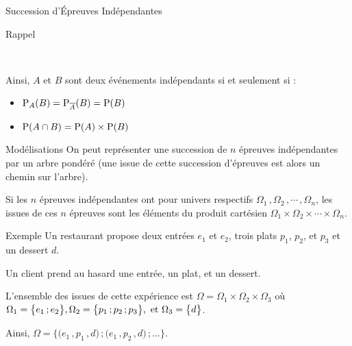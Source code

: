 \documentclass{coursbook}
\begin{document}
\begin{Gpartie}{Succession d'Épreuves Indépendantes}
\begin{Spartie}{Rappel}
\begin{center}
                \parbox{\linewidth}{} \\[2ex]
            \end{center}
            Ainsi, $A$ et $B$ sont deux événements indépendants si et seulement si :
            \begin{itemize}
                \item $\mathrm{P}_A(B)=\mathrm{P}_{\overline{A}}(B)=\mathrm{P}(B)$
                \item $\mathrm{P}(A\cap B)=\mathrm{P}(A)\times\mathrm{P}(B)$
            \end{itemize}
        \end{Spartie}
        \begin{Spartie}{Modélisations} 
            On peut représenter une succession de $n$ épreuves indépendantes par un arbre pondéré (une issue de cette succession d'épreuves est alors un chemin sur l'arbre).

            Si les $n$ épreuves indépendantes ont pour univers respectifs $\Omega_1\,,\Omega_2\,,\dotsb\,,\Omega_n$, les issues de ces $n$ épreuves sont les éléments du produit cartésien $\Omega_1\times\Omega_2\times\dotsb\times\Omega_n$.
        \end{Spartie}
        \begin{Spartie}{Exemple} 
            Un restaurant propose deux entrées $e_1$ et $e_2$, trois plats $p_1$, $p_2$, et $p_3$ et un dessert $d$.

            Un client prend au hasard une entrée, un plat, et un dessert.

            L'ensemble des issues de cette expérience est $\Omega=\Omega_1\times\Omega_2\times\Omega_3$ où $\Omega_1=\big\{e_1\,; e_2\big\},\\{\Omega_2=\big\{p_1\,; p_2\,; p_3\big\}},\text{ et }\Omega_3=\big\{d\big\}$.

            Ainsi, $\Omega=\bigg\{\big(e_1\,, p_1\,, d\big)\,;\big(e_1\,, p_2\,, d\big)\,;\dotsc\bigg\}$.


\end{Spartie}
\end{Gpartie}
\end{document}
